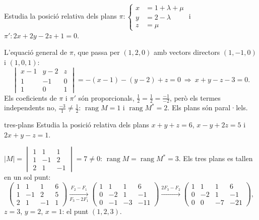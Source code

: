\begin{apartats}

Estudia la posició relativa dels plans
$\pi\colon\left\{\begin{aligned}x&=1+\lambda+\mu\\y&=2-\lambda\\z&=\mu\end{aligned}\right.$ i
$\pi'\colon 2x+2y-2z+1=0$.

\begin{solucio}
L'equació general de $\pi$, que passa per $(1,2,0)$ amb vectors directors $(1,-1,0)$ i $(1,0,1)$:
\[
\begin{vmatrix}x-1&y-2&z\\1&-1&0\\1&0&1\end{vmatrix}=-(x-1)-(y-2)+z=0
\ \Longrightarrow\ x+y-z-3=0.
\]
Els coeficients de $\pi$ i $\pi'$ són proporcionals, $\frac12=\frac12=\frac{-1}{-2}$, però els termes
independents no, $\frac{-3}1\ne\frac12$: $\operatorname{rang}M=1$ i $\operatorname{rang}M^*=2$. Els plans són
paral·lels.
\end{solucio}

\begin{tria}{tres-plans}
Estudia la posició relativa dels plans $x+y+z=6$, $x-y+2z=5$ i $2x+y-z=1$.

\begin{solucio}
$|M|=\begin{vmatrix}1&1&1\\1&-1&2\\2&1&-1\end{vmatrix}=7\ne0$:
$\operatorname{rang}M=\operatorname{rang}M^*=3$. Els tres plans es tallen en un sol punt:
\[
\left(\begin{array}{ccc|c}1&1&1&6\\1&-1&2&5\\2&1&-1&1\end{array}\right)
\xrightarrow[F_3-2F_1]{F_2-F_1}
\left(\begin{array}{ccc|c}1&1&1&6\\0&-2&1&-1\\0&-1&-3&-11\end{array}\right)
\xrightarrow{2F_3-F_2}
\left(\begin{array}{ccc|c}1&1&1&6\\0&-2&1&-1\\0&0&-7&-21\end{array}\right),
\]
$z=3$, $y=2$, $x=1$: el punt $(1,2,3)$.
\end{solucio}


\end{tria}
\end{apartats}
